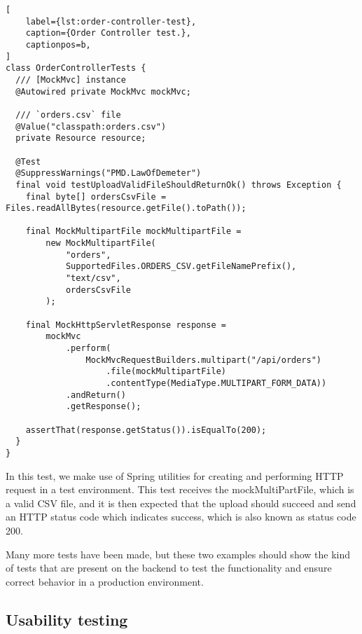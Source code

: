 \begin{lstlisting}[
    label={lst:order-controller-test},
    caption={Order Controller test.},
    captionpos=b,
]
class OrderControllerTests {
  /// [MockMvc] instance
  @Autowired private MockMvc mockMvc;

  /// `orders.csv` file
  @Value("classpath:orders.csv")
  private Resource resource;

  @Test
  @SuppressWarnings("PMD.LawOfDemeter")
  final void testUploadValidFileShouldReturnOk() throws Exception {
    final byte[] ordersCsvFile = Files.readAllBytes(resource.getFile().toPath());

    final MockMultipartFile mockMultipartFile =
        new MockMultipartFile(
            "orders",
            SupportedFiles.ORDERS_CSV.getFileNamePrefix(),
            "text/csv",
            ordersCsvFile
        );

    final MockHttpServletResponse response =
        mockMvc
            .perform(
                MockMvcRequestBuilders.multipart("/api/orders")
                    .file(mockMultipartFile)
                    .contentType(MediaType.MULTIPART_FORM_DATA))
            .andReturn()
            .getResponse();

    assertThat(response.getStatus()).isEqualTo(200);
  }
}
\end{lstlisting}

In this test, we make use of Spring utilities for creating and performing HTTP request in a test
environment.
This test receives the mockMultiPartFile, which is a valid CSV file, and it is then expected that the
upload should succeed and send an HTTP status code which indicates success,
which is also known as status code 200.

Many more tests have been made, but these two examples should show the kind of tests that are
present on the backend to test the functionality and ensure correct behavior in a
production environment.

\subsection{Usability testing}\label{subsec:usability-tests}
